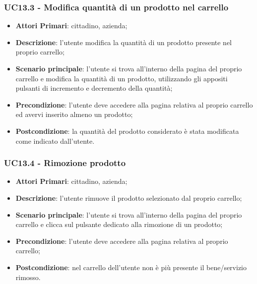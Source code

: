 \subsubsection{UC13.3 - Modifica quantità di un prodotto nel carrello}
\begin{itemize}
	\item \textbf{Attori Primari}: cittadino, azienda;
	\item \textbf{Descrizione}: l'utente modifica la quantità di un prodotto presente nel proprio carrello;
	\item \textbf{Scenario principale}: l'utente si trova all'interno della pagina del proprio carrello e modifica la quantità di un prodotto, utilizzando gli appositi pulsanti di incremento e decremento della quantità;
	\item \textbf{Precondizione}: l'utente deve accedere alla pagina relativa al proprio carrello ed avervi inserito almeno un prodotto;
	\item \textbf{Postcondizione}: la quantità del prodotto considerato è stata modificata come indicato dall'utente.
\end{itemize}

\subsubsection{UC13.4 - Rimozione prodotto}
\begin{itemize}
	\item \textbf{Attori Primari}: cittadino, azienda;
	\item \textbf{Descrizione}: l'utente rimuove il prodotto selezionato dal proprio carrello;
	\item \textbf{Scenario principale}: l'utente si trova all'interno della pagina del proprio carrello e clicca sul pulsante dedicato alla rimozione di un prodotto;
	\item \textbf{Precondizione}: l'utente deve accedere alla pagina relativa al proprio carrello;
	\item \textbf{Postcondizione}: nel carrello dell'utente non è più presente il bene/servizio rimosso.
\end{itemize}